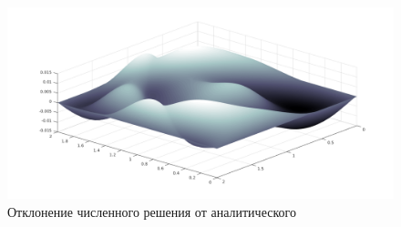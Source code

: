 \documentclass[11pt]{article}
\numberwithin{equation}{section}
\theoremstyle{plain}
\theoremstyle{definition}
\begin{document}
\begin{figure}[h]
    \centering
    \includegraphics[width=\textwidth]{fig_err}
    \caption{Отклонение численного решения от аналитического}
    \label{fig_err}
\end{figure}
\end{document}
